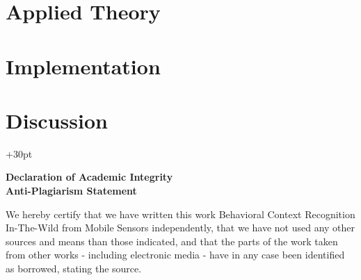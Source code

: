 \documentclass[a4paper,12pt]{scrartcl}
\begin{document}
\newpage
\setcounter{page}{1}









\section{Applied Theory}























\section{Implementation}



\section{Discussion}

\newpage

\printbibliography
\hangindent+30pt 


\newpage
{}
\vspace*{1cm}
\begin{center}
	\Large \textbf{Declaration of Academic Integrity}\\
	
	\large \textbf{Anti-Plagiarism Statement}
\end{center}

\normalsize
\vspace{25mm}
We hereby certify that we have written this work \grqq Behavioral Context Recognition In-The-Wild from Mobile Sensors\grqq{} independently, that we have not used any other sources and means than those indicated, and that the parts of the work taken from other works - including electronic media - have in any case been identified as borrowed, stating the source.\\
\end{document}
